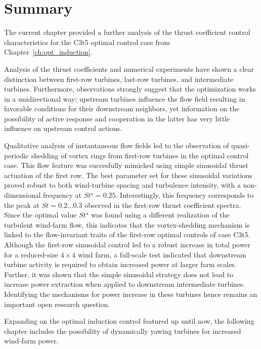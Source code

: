 \section{Summary}\label{sec:analysis_summ}
The current chapter provided a further analysis of the thrust coefficient control characteristics for the C3t5 optimal control case from Chapter~\ref{ch:opt_induction}. 

Analysis of the thrust coefficients and numerical experiments have shown a clear distinction between first-row turbines, last-row turbines, and intermediate turbines. Furthermore, observations strongly suggest that the optimization works in a unidirectional way: upstream turbines influence the flow field resulting in favorable conditions for their downstream neighbors, yet information on the possibility of active response and cooperation in the latter has very little influence on upstream control actions. 

Qualitative analysis of instantaneous flow fields led to the observation of quasi-periodic shedding of vortex rings from first-row turbines in the optimal control case. This flow feature was succesfully mimicked using simple sinusoidal thrust actuation of the first row. The best parameter set for these sinusoidal variations proved robust to both wind-turbine spacing and turbulence intensity, with a non-dimensional frequency at $St^\star = 0.25$. Interestingly, this frequency corresponds to the peak at $St = 0.2 \dots 0.3$ observed in the first-row thrust coefficient spectra. Since the optimal value $St^\star$ was found using a different realization of the turbulent wind-farm flow, this indicates that the vortex-shedding mechanism is linked to the flow-invariant traits of the first-row optimal controls of case C3t5. Although the first-row sinusoidal control led to a robust increase in total power for a reduced-size $4\times4$ wind farm, a full-scale test indicated that downstream turbine activity is required to obtain increased power at larger farm scales. Further, it was shown that the simple sinusoidal strategy does not lead to increase power extraction when applied to downstream intermediate turbines. Identifying the mechanisms for power increase in these turbines hence remains an important open research question. 

Expanding on the optimal induction control featured up until now, the following chapter includes the possibility of dynamically yawing turbines for increased wind-farm power. 


\cleardoublepage
